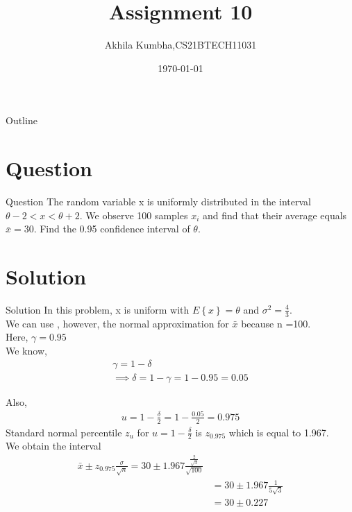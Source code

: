 \documentclass{beamer}
\title{Assignment 10}
\author{Akhila Kumbha,CS21BTECH11031}
\date{\today}
\providecommand{\cbrak}[1]{\ensuremath{\left\{#1\right\}}}
\begin{document}
\begin{frame}
    \titlepage 
\end{frame}

\logo{}

\begin{frame}{Outline}
    \tableofcontents
\end{frame}


\section{Question}
\begin{frame}{Question}
The random variable x is uniformly distributed in the interval $\theta - 2 < x < \theta + 2$. We 
observe 100 samples $x_i$ and find that their average equals $\bar{x} =30 $. Find the 0.95 confidence 
interval of $\theta$.\\

\end{frame}


\section{Solution}
\begin{frame}{Solution}
In this problem, x is uniform with $E\cbrak{x}=\theta$ and $\sigma^2=\frac{4}{3}$.\\
We can use , however, the normal approximation for $\bar{x}$ because n =100.\\

Here, $\gamma=0.95$\\

We know,
\begin{align}
    \gamma = 1- \delta\\
    \implies \delta=1-\gamma = 1-0.95 = 0.05
\end{align}
\end{frame} 

\begin{frame}
Also,
    \begin{align}
      u=1-\frac{\delta}{2}=1-\frac{0.05}{2}=0.975    
    \end{align}
Standard normal percentile $z_u$ for $ u=1-\frac{\delta}{2}$ is $z_{0.975}$ which is equal to 1.967.\\
We obtain the interval
\begin{align}
    \bar{x} \pm z_{0.975} \frac{\sigma}{\sqrt{n}} = 30 \pm 1.967 \frac{\frac{2}{\sqrt{3}}}{\sqrt{100}}\\
   & =30\pm 1.967 \frac{1}{5\sqrt{3}}\\
    &= 30\pm 0.227
\end{align}
\end{frame}
\end{document}
